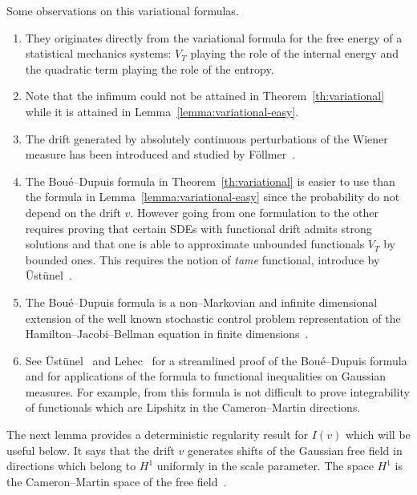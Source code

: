 \documentclass[11pt, oneside]{article}   	%
\newcommand{\tmtextit}[1]{{\itshape{#1}}}
\newenvironment{enumeratealpha}{\begin{enumerate}[a{\textup{)}}] }{\end{enumerate}}
\begin{document}
\begin{remark}
  Some observations on this variational formulas.
  \begin{enumeratealpha}
    \item They originates directly from the variational formula for the free
    energy of a statistical mechanics systems: $V_T$ playing the role of the
    internal energy and the quadratic term playing the role of the entropy.
    
    \item Note that the infimum could not be attained in
    Theorem~\ref{th:variational} while it is attained in
    Lemma~\ref{lemma:variational-easy}.
    
    \item The drift generated by absolutely continuous perturbations of the
    Wiener measure has been introduced and studied by
    F{\"o}llmer~{\cite{follmer_entropy_1985}}.
    
    \item The Bou{\'e}--Dupuis formula in Theorem~\ref{th:variational} is
    easier to use than the formula in Lemma~\ref{lemma:variational-easy} since
    the probability do not depend on the drift $v$. However going from one
    formulation to the other requires proving that certain SDEs with
    functional drift admits strong solutions and that one is able to
    approximate unbounded functionals $V_T$ by bounded ones. This requires the
    notion of \tmtextit{tame} functional, introduce by
    {\"U}st{\"u}nel~{\cite{ustunel_variational_2014}}.
    
    \item The Bou{\'e}--Dupuis formula is a non--Markovian and infinite
    dimensional extension of the well known stochastic control problem
    representation of the Hamilton--Jacobi--Bellman equation in finite
    dimensions~{\cite{fleming_controlled_2005}}.
    
    \item See {\"U}st{\"u}nel~{\cite{ustunel_variational_2014}} and
    Lehec~{\cite{lehec_representation_2013}} for a streamlined proof of the
    Bou{\'e}--Dupuis formula and for applications of the formula to functional
    inequalities on Gaussian measures. For example, from this formula is not
    difficult to prove integrability of functionals which are Lipshitz in the
    Cameron--Martin directions.
  \end{enumeratealpha}
\end{remark}

The next lemma provides a deterministic regularity result for $I (v)$ which
will be useful below. It says that the drift $v$ generates shifts of the
Gaussian free field in directions which belong to $H^1$ uniformly in the scale
parameter. The space $H^1$ is the Cameron--Martin space of the free
field~{\cite{janson_gaussian_1997}}.
\end{document}
